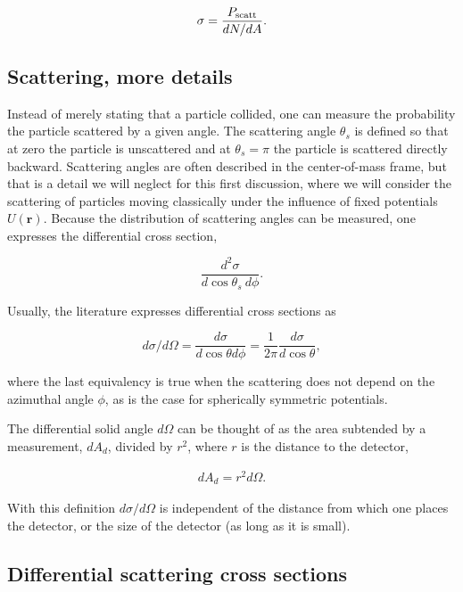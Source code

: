 \documentclass[%
oneside,                 %
final,                   %
10pt]{article}
\begin{document}
\begin{eqnarray}
\sigma=\frac{P_{\rm scatt}}{dN/dA}.
\end{eqnarray}

\subsection*{Scattering, more details}

Instead of merely stating that a particle collided, one can measure
the probability the particle scattered by a given angle. The
scattering angle $\theta_s$ is defined so that at zero the particle is
unscattered and at $\theta_s=\pi$ the particle is scattered directly
backward. Scattering angles are often described in the center-of-mass
frame, but that is a detail we will neglect for this first discussion,
where we will consider the scattering of particles moving classically
under the influence of fixed potentials $U(\bm{r})$. Because the
distribution of scattering angles can be measured, one expresses the
differential cross section,

\begin{equation}
\frac{d^2\sigma}{d\cos\theta_s~d\phi}.
\end{equation}

Usually, the literature expresses differential cross sections as

\begin{equation}
d\sigma/d\Omega=\frac{d\sigma}{d\cos\theta d\phi}=\frac{1}{2\pi}\frac{d\sigma}{d\cos\theta},
\end{equation}

where the last equivalency is true when the scattering does not depend
on the azimuthal angle $\phi$, as is the case for spherically
symmetric potentials.

The differential solid angle $d\Omega$ can be thought of as the area
subtended by a measurement, $dA_d$, divided by $r^2$, where $r$ is the
distance to the detector,

\begin{eqnarray}
dA_d=r^2 d\Omega.
\end{eqnarray}

With this definition $d\sigma/d\Omega$ is independent of the distance
from which one places the detector, or the size of the detector (as
long as it is small).

\subsection*{Differential scattering cross sections}
\end{document}

